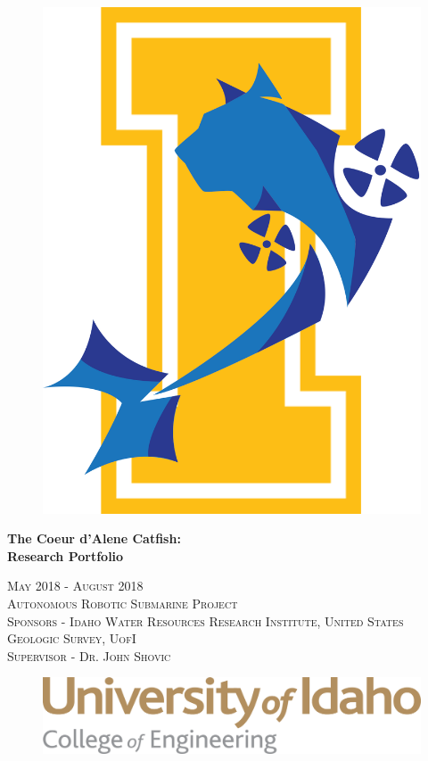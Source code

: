 \documentclass[12pt]{article}
\begin{document}
	\begin{titlepage}
		\centering	
    
    \begin{figure}[h]
      \centering
      \includegraphics[width=0.38\linewidth]{assets/New_Logov1.png}
    \end{figure} 
  
  {\huge\bfseries The Coeur d'Alene Catfish: \\ Research Portfolio\par}
    
    \title{}
    \date{\vspace{-5ex}} %
    \author{%
    	\\Team Manager\\
    	\and {}\\Designer\\
    }
    \let\newpage\relax\maketitle %
    \maketitle		
    
    \vspace{1cm} 
    
    {\scshape\Large 
      May 2018 - August 2018 \\
      Autonomous Robotic Submarine Project\\ 
      Sponsors - Idaho Water Resources Research Institute, United States Geologic Survey, UofI \\
      Supervisor - Dr. John Shovic
      \par}
    
     \vspace{1cm} 
    
    \begin{figure}[h]
      \centering
      \includegraphics[width=0.6\linewidth]{assets/uislogan.png}
    \end{figure} 
  
		\vfill		
	\end{titlepage}
\end{document}
